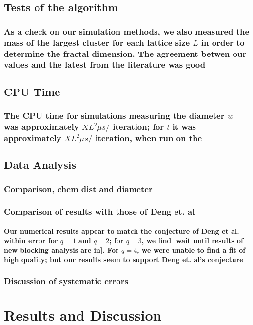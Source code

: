 \documentclass[pre,preprint]{revtex4-1}
\begin{document}
\subsection{Tests of the algorithm}
\label{sec-3.6}
\subsubsection{As a check on our simulation methods, we also measured the mass of the largest cluster for each lattice size $L$ in order to determine the fractal dimension.  The agreement betwen our values and the latest from the literature was good}
\label{sec-3.6.1}
\subsection{CPU Time}
\label{sec-3.7}
\subsubsection{The CPU time for simulations measuring the diameter $w$ was approximately $X L^2 \mu s /$ iteration; for $l$ it was approximately $X L^2 \mu s /$ iteration, when run on the}
\label{sec-3.7.1}
\subsection{Data Analysis}
\label{sec-3.8}
\subsubsection{Comparison, chem dist and diameter}
\label{sec-4.1}
\subsubsection{Comparison of results with those of Deng et. al}
\label{sec-4.2}
\paragraph{Our numerical results appear to match the conjecture of Deng et al. \cite{Deng2010} within error for $q=1$ and $q=2$; for $q=3$, we find [wait until results of new blocking analysis are in].  For $q=4$, we were unable to find a fit of high quality; but our results seem to support Deng et. al's conjecture}
\label{sec-4.2.1}
\subsubsection{Discussion of systematic errors}
\label{sec-4.3}



\section{Results and Discussion}
\label{sec-4}
\end{document}
